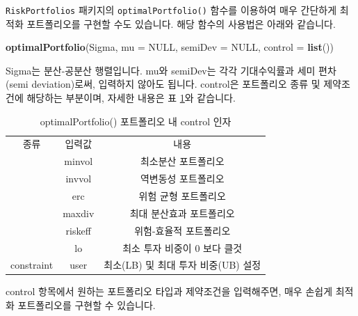 \documentclass[12pt,]{book}
\newenvironment{Shaded}{\begin{snugshade}}{\end{snugshade}}
\newcommand{\DataTypeTok}[1]{\textcolor[rgb]{0.13,0.29,0.53}{#1}}
\newcommand{\KeywordTok}[1]{\textcolor[rgb]{0.13,0.29,0.53}{\textbf{#1}}}
\newcommand{\NormalTok}[1]{#1}
\newcommand{\OtherTok}[1]{\textcolor[rgb]{0.56,0.35,0.01}{#1}}
\begin{document}
\texttt{RiskPortfolios} 패키지의 \texttt{optimalPortfolio()} 함수를 이용하여 매우 간단하게 최적화 포트폴리오를 구현할 수도 있습니다. 해당 함수의 사용법은 아래와 같습니다.

\begin{Shaded}
\begin{Highlighting}[]
\KeywordTok{optimalPortfolio}\NormalTok{(Sigma, }\DataTypeTok{mu =} \OtherTok{NULL}\NormalTok{, }\DataTypeTok{semiDev =} \OtherTok{NULL}\NormalTok{,}
                 \DataTypeTok{control =} \KeywordTok{list}\NormalTok{())}
\end{Highlighting}
\end{Shaded}

Sigma는 분산-공분산 행렬입니다. mu와 semiDev는 각각 기대수익률과 세미 편차(semi deviation)로써, 입력하지 않아도 됩니다. control은 포트폴리오 종류 및 제약조건에 해당하는 부분이며, 자세한 내용은 표 \ref{tab:optimal}와 같습니다.

\begin{table}[!h]

\caption{\label{tab:optimal}optimalPortfolio() 포트폴리오 내 control 인자}
\centering
\begin{tabular}{ccc}
\toprule
종류 & 입력값 & 내용\\
\rowcolor{gray!6}
\midrule
 & minvol & 최소분산 포트폴리오\\

\rowcolor{gray!6}
 & invvol & 역변동성 포트폴리오\\

\rowcolor{gray!6}
 & erc & 위험 균형 포트폴리오\\

\rowcolor{gray!6}
 & maxdiv & 최대 분산효과 포트폴리오\\

\rowcolor{gray!6}
\multirow{-5}{*}{\centering\arraybackslash type} & riskeff & 위험-효율적 포트폴리오\\

 & lo & 최소 투자 비중이 0 보다 클것\\

\multirow{-2}{*}{\centering\arraybackslash constraint} & user & 최소(LB) 및 최대 투자 비중(UB) 설정\\
\bottomrule
\end{tabular}
\end{table}

control 항목에서 원하는 포트폴리오 타입과 제약조건을 입력해주면, 매우 손쉽게 최적화 포트폴리오를 구현할 수 있습니다.
\end{document}
